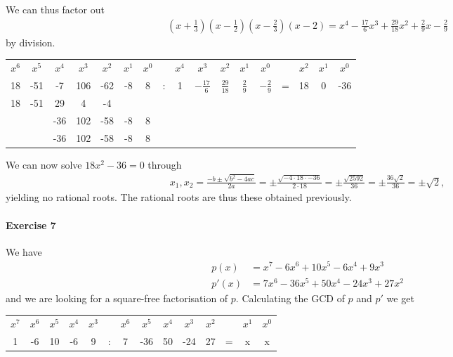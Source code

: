 \documentclass{article}
\begin{document}
We can thus factor out
\begin{align*}
    \left(x + \frac{1}{3}\right)\left(x - \frac{1}{2}\right)\left(x - \frac{2}{3}\right)(x - 2) = x^4-\frac{17}{6}x^3+\frac{29}{18}x^2+\frac{2}{9}x-\frac{2}{9}
\end{align*}
by division.

\begin{center}
    \begin{tabular}{ccccccc c ccccc c ccc}
        $x^6$&$x^5$&$x^4$&$x^3$&$x^2$&$x^1$&$x^0$&&$x^4$&$x^3$&$x^2$&$x^1$&$x^0$&&$x^2$&$x^1$&$x^0$ \\
        18&-51&-7&106&-62&-8&8&:&1&$-\frac{17}{6}$&$\frac{29}{18}$&$\frac{2}{9}$&$-\frac{2}{9}$&=&18&0&-36 \\
        18&-51&29&4&-4&&&&&&&&&&&& \\\cmidrule{1-5}
        &&-36&102&-58&-8&8&&&&&&&&& \\
        &&-36&102&-58&-8&8\\\cmidrule{3-7}
    \end{tabular}
\end{center}

We can now solve $18x^2 - 36 = 0$ through
\begin{align*}
    x_1,x_2 = \frac{-b \pm \sqrt{b^2 - 4ac}}{2a} =
    \pm\frac{\sqrt{-4 \cdot 18 \cdot -36}}{2 \cdot 18} =
    \pm\frac{\sqrt{2592}}{36} =
    \pm\frac{36\sqrt{2}}{36} = \pm \sqrt{2},
\end{align*}
yielding no rational roots. The rational roots are thus these obtained previously.

\pagebreak
\paragraph{Exercise 7}

We have
\begin{align*}
    p(x) &= x^7 - 6x^6 + 10x^5 - 6x^4 + 9x^3 \\
    p'(x) &= 7x^6 - 36x^5 + 50x^4 - 24x^3 + 27x^2
\end{align*}
and we are looking for a square-free factorisation of $p$. Calculating the GCD of $p$ and $p'$ we get

\begin{center}
    \begin{tabular}{cccccc c cccc c cc}
        $x^7$&$x^6$&$x^5$&$x^4$&$x^3$&&$x^6$&$x^5$&$x^4$&$x^3$&$x^2$&&$x^1$&$x^0$ \\
        1&-6&10&-6&9&:&7&-36&50&-24&27&=&x&x\\
    \end{tabular}
\end{center}
\end{document}
